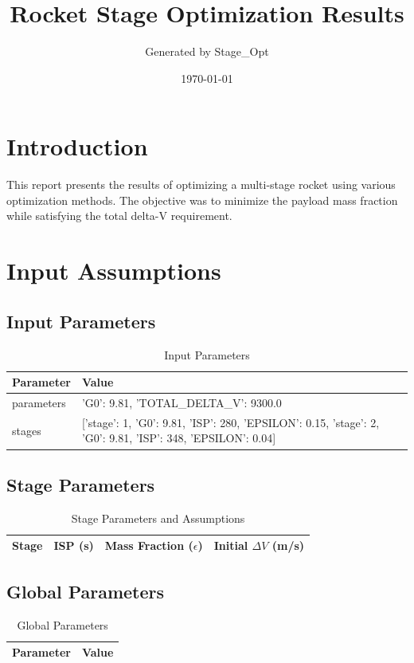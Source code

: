 \documentclass{article}
\title{Rocket Stage Optimization Results}
\author{Generated by Stage\_Opt}
\date{\today}
\begin{document}
\maketitle

\section{Introduction}
This report presents the results of optimizing a multi-stage rocket using various optimization methods. The objective was to minimize the payload mass fraction while satisfying the total delta-V requirement.

\section{Input Assumptions}
\subsection{Input Parameters}
\begin{table}[H]
\centering
\caption{Input Parameters}
\begin{tabular}{ll}
\toprule
Parameter & Value \\
\midrule
parameters & {'G0': 9.81, 'TOTAL_DELTA_V': 9300.0} \\
stages & [{'stage': 1, 'G0': 9.81, 'ISP': 280, 'EPSILON': 0.15}, {'stage': 2, 'G0': 9.81, 'ISP': 348, 'EPSILON': 0.04}] \\
\bottomrule
\end{tabular}
\end{table}

\subsection{Stage Parameters}
\begin{table}[H]
\centering
\caption{Stage Parameters and Assumptions}
\begin{tabular}{cccc}
\toprule
Stage & ISP (s) & Mass Fraction ($\epsilon$) & Initial $\Delta V$ (m/s) \\
\midrule
\bottomrule
\end{tabular}
\end{table}

\subsection{Global Parameters}
\begin{table}[H]
\centering
\caption{Global Parameters}
\begin{tabular}{lS[table-format=4.2]}
\toprule
Parameter & {Value} \\
\midrule
\bottomrule
\end{tabular}
\end{table}
\end{document}
